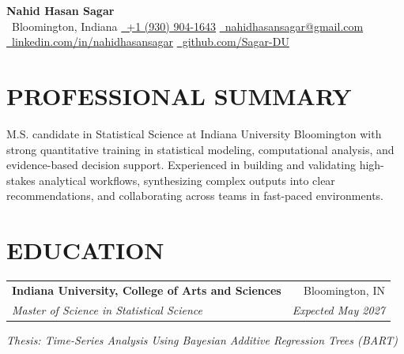 \documentclass[10pt,letterpaper]{article}
\makeatletter
\newcommand{\resumeEntry}[4]{%
	\begin{tabularx}{\textwidth}{@{}Xr@{}}
		\textbf{#1} & #2 \\
		\textit{#3} & \textit{#4}
	\end{tabularx}%
}
\newcommand{\contactsep}{\qquad}
\makeatother
\begin{document}
\normalsize

\begin{center}
	{\LARGE
	 \textbf{Nahid Hasan Sagar}}\\[2.2pt]

	{\footnotesize
		\faMapMarker*\, Bloomington, Indiana
		\contactsep
		\href{tel:+19309041643}{\faPhone*\, +1 (930) 904-1643}
		\contactsep
		\href{mailto:nahidhasansagar@gmail.com}{\faEnvelope\, nahidhasansagar@gmail.com}
	}\\[-0.2pt]

	{\footnotesize
		\href{https://www.linkedin.com/in/nahidhasansagar/}{\faLinkedinIn\, linkedin.com/in/nahidhasansagar}
		\contactsep
		\href{https://github.com/Sagar-DU}{\faGithub\, github.com/Sagar-DU}
	}
\end{center}

\vspace{-5pt}

\section*{PROFESSIONAL SUMMARY}

M.S. candidate in Statistical Science at Indiana University Bloomington with strong quantitative training in statistical modeling, computational analysis, and evidence-based decision support. Experienced in building and validating high-stakes analytical workflows, synthesizing complex outputs into clear recommendations, and collaborating across teams in fast-paced environments.

\section*{EDUCATION}

\resumeEntry
	{Indiana University, College of Arts and Sciences}
	{Bloomington, IN}
	{Master of Science in Statistical Science}
	{Expected May 2027}

\vspace{0.4pt}

\textit{Thesis: Time-Series Analysis Using Bayesian Additive Regression Trees (BART)}
\end{document}
